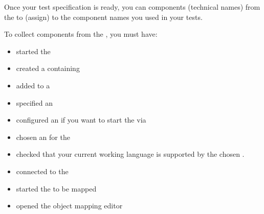 
Once your test specification is ready, you can   components (technical names) from the \gdaut{} to  (assign) to the component names you used in your tests. 

To collect components from the \gdaut{}, you must have: 

\begin{itemize}
\item started the \gdserver{} 
\item created a \gdcase{} containing \gdsteps{} 
\item added \gdcases to a \gdsuite{} 
\item specified an \gdaut{}  
\item configured an \gdaut{}  if you want to start the \gdaut{} via \gd{}
\item chosen an \gdaut{} for the \gdsuite{} 
\item checked that your current working language is supported by the chosen \gdaut{}. 
\item connected to the \gdserver{} 
\item started the \gdaut{} to be mapped 
\item opened the object mapping editor 
\end{itemize}


